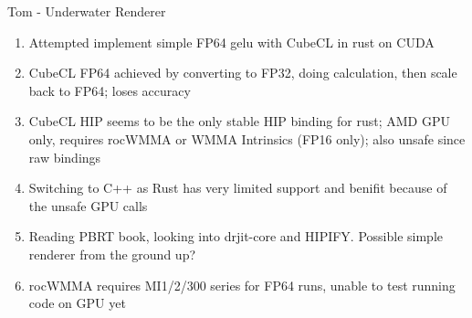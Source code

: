 \begin{frame}{Tom - Underwater Renderer}
    \begin{enumerate}
      \item Attempted implement simple FP64 gelu with CubeCL in rust on CUDA
      \item CubeCL FP64 achieved by converting to FP32, doing calculation, then scale back to FP64; loses accuracy
      \item CubeCL HIP seems to be the only stable HIP binding for rust; AMD GPU only, requires rocWMMA or WMMA Intrinsics (FP16 only); also unsafe since raw bindings
      \item Switching to C++ as Rust has very limited support and benifit because of the unsafe GPU calls
      \item Reading PBRT book, looking into drjit-core and HIPIFY. Possible simple renderer from the ground up?
      \item rocWMMA requires MI1/2/300 series for FP64 runs, unable to test running code on GPU yet
    \end{enumerate}
\end{frame}
